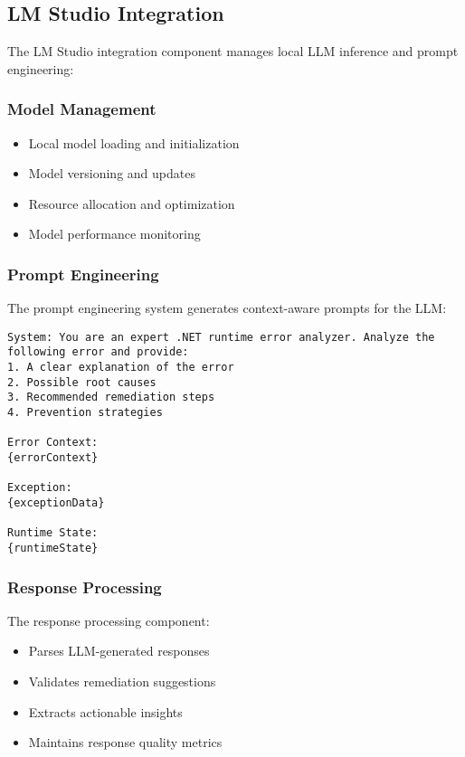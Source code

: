 \subsection{LM Studio Integration}
The LM Studio integration component manages local LLM inference and prompt engineering:

\subsubsection{Model Management}
\begin{itemize}
    \item Local model loading and initialization
    \item Model versioning and updates
    \item Resource allocation and optimization
    \item Model performance monitoring
\end{itemize}

\subsubsection{Prompt Engineering}
The prompt engineering system generates context-aware prompts for the LLM:

\begin{lstlisting}[language=text]
System: You are an expert .NET runtime error analyzer. Analyze the following error and provide:
1. A clear explanation of the error
2. Possible root causes
3. Recommended remediation steps
4. Prevention strategies

Error Context:
{errorContext}

Exception:
{exceptionData}

Runtime State:
{runtimeState}
\end{lstlisting}

\subsubsection{Response Processing}
The response processing component:

\begin{itemize}
    \item Parses LLM-generated responses
    \item Validates remediation suggestions
    \item Extracts actionable insights
    \item Maintains response quality metrics
\end{itemize}

